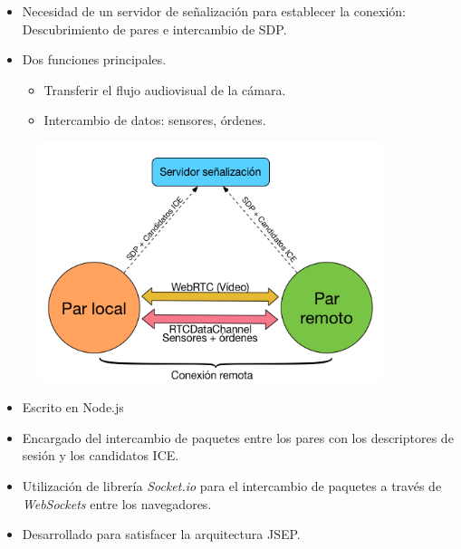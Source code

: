 \documentclass[notes,slidesec,a4]{seminar}
\begin{document}

\begin{hslide}
\begin{minipage}[t]{0.6\textwidth}
\begin{itemize}
\item Necesidad de un servidor de señalización para establecer la conexión: Descubrimiento de pares e intercambio de SDP.
\item Dos funciones principales.
\begin{itemize}
\item Transferir el flujo audiovisual de la cámara.
\item Intercambio de datos: sensores, órdenes.
\end{itemize}
\end{itemize}

\end{minipage}
\begin{minipage}[t]{0.6\textwidth}
\begin{center}
\begin{figure}
\includegraphics[width=0.9\textwidth]{img/conexionremota}
\end{figure}
\end{center}
\end{minipage}

\end{hslide}



\begin{hslide}
\begin{itemize}
\item Escrito en Node.js
\item Encargado del intercambio de paquetes entre los pares con los descriptores de sesión y los candidatos ICE.
\item Utilización de librería \emph{Socket.io} para el intercambio de paquetes a través de \emph{WebSockets} entre los navegadores.
\item Desarrollado para satisfacer la arquitectura JSEP.
\end{itemize}
\end{hslide}
\end{document}
